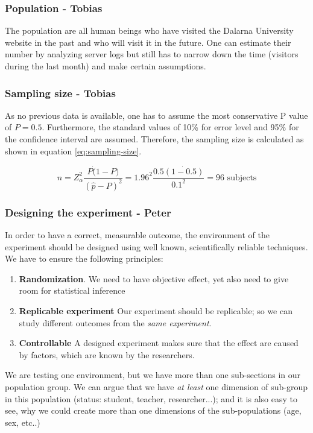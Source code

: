 \documentclass[12pt,a4paper,paper=a4,oneside,titlepage,pdftex]{scrartcl}
\begin{document}
\subsubsection{Population - Tobias}
The population are all human beings who have visited the Dalarna University website in the past and who will visit it in the future. One can estimate their number by analyzing server logs but still has to narrow down the time (visitors during the last month) and make certain assumptions.

\subsubsection{Sampling size - Tobias}
As no previous data is available, one has to assume the most conservative P value of $ P = 0.5 $. Furthermore, the standard values of 10\% for error level and 95\% for the confidence interval are assumed. Therefore, the sampling size is calculated as shown in equation \ref{eq:sampling-size}.

\begin{equation}
n = Z^2_\alpha \frac{P\dot(1-P)}{(\hat{p}-P)^2} = 1.96^2\frac{0.5\dot{(1-0.5)}}{0.1^2}=96 \text{ subjects}
\label{eq:sampling-size}
\end{equation}

\subsubsection{Designing the experiment - Peter}
In order to have a correct, measurable outcome, the environment of the experiment should be designed using well known, scientifically reliable techniques. We have to ensure the following principles:
\begin{enumerate}
\item \textbf{Randomization}.  We need to have objective effect, yet also need to give room for statistical inference
\item\textbf{Replicable experiment} Our experiment should be replicable; so we can study different outcomes from the \textit{same experiment}.
\item \textbf{Controllable} A designed experiment makes sure that the effect are caused by factors, which are known by the researchers.
\end{enumerate}

We are testing one environment, but we have more than one sub-sections in our population group. We can argue that we have \textit{at least} one dimension of sub-group in this population (status: student, teacher, researcher...); and it is also easy to see, why we could create more than one dimensions of the sub-populations (age, sex, etc..)
\end{document}
